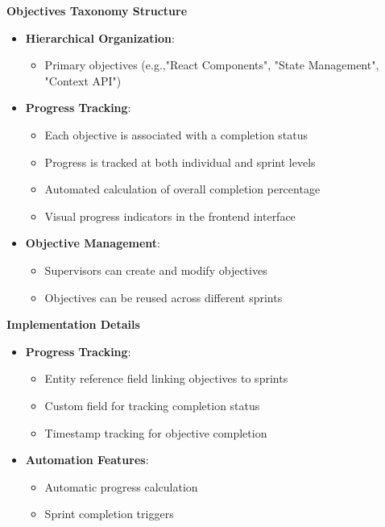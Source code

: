 \textbf{Objectives Taxonomy Structure}
\begin{itemize}
    \item \textbf{Hierarchical Organization}:
    \begin{itemize}
        \item Primary objectives (e.g.,"React Components", "State Management", "Context API")
    \end{itemize}
    
    \item \textbf{Progress Tracking}:
    \begin{itemize}
        \item Each objective is associated with a completion status
        \item Progress is tracked at both individual and sprint levels
        \item Automated calculation of overall completion percentage
        \item Visual progress indicators in the frontend interface
    \end{itemize}
    
    \item \textbf{Objective Management}:
    \begin{itemize}
        \item Supervisors can create and modify objectives
        \item Objectives can be reused across different sprints
    \end{itemize}
\end{itemize}

\textbf{Implementation Details}
\begin{itemize}
    
    \item \textbf{Progress Tracking}:
    \begin{itemize}
        \item Entity reference field linking objectives to sprints
        \item Custom field for tracking completion status
        \item Timestamp tracking for objective completion
    \end{itemize}
    
    \item \textbf{Automation Features}:
    \begin{itemize}
        \item Automatic progress calculation
        \item Sprint completion triggers
    \end{itemize}
\end{itemize}

